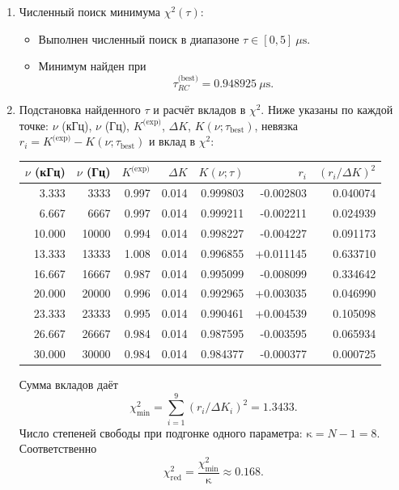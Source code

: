 \documentclass[a4paper,12pt]{article}
\begin{document}
\begin{enumerate}
\begin{enumerate}
  \item Численный поиск минимума $\chi^2(\tau)$:
  \begin{itemize}
    \item Выполнен численный поиск в диапазоне $\tau\in[0,5]\ \mu\text{s}$.
    \item Минимум найден при
    \[
    \tau_{RC}^{\text{(best)}} = 0.948925\ \mu\text{s}.
    \]
  \end{itemize}

  \item Подстановка найденного $\tau$ и расчёт вкладов в $\chi^2$. Ниже указаны по каждой точке: $\nu$ (кГц), $\nu$ (Гц), $K^{\text{(exp)}}$, $\Delta K$, $K(\nu;\tau_{\text{best}})$, невязка $r_i=K^{\text{(exp)}}-K(\nu;\tau_{\text{best}})$ и вклад в $\chi^2$:
  
  \begin{center}
  \begin{tabular}{|r|r|r|r|r|r|r|}
  \hline
  $\nu$ (кГц) & $\nu$ (Гц) & $K^{\text{(exp)}}$ & $\Delta K$ & $K(\nu;\tau)$ & $r_i$ & $(r_i/\Delta K)^2$ \\ \hline
   3.333 &  3333 & 0.997 & 0.014 & 0.999803 & -0.002803 & 0.040074 \\\hline
   6.667 &  6667 & 0.997 & 0.014 & 0.999211 & -0.002211 & 0.024939 \\\hline
  10.000 & 10000 & 0.994 & 0.014 & 0.998227 & -0.004227 & 0.091173 \\\hline
  13.333 & 13333 & 1.008 & 0.014 & 0.996855 & +0.011145 & 0.633710 \\\hline
  16.667 & 16667 & 0.987 & 0.014 & 0.995099 & -0.008099 & 0.334642 \\\hline
  20.000 & 20000 & 0.996 & 0.014 & 0.992965 & +0.003035 & 0.046990 \\\hline
  23.333 & 23333 & 0.995 & 0.014 & 0.990461 & +0.004539 & 0.105098 \\\hline
  26.667 & 26667 & 0.984 & 0.014 & 0.987595 & -0.003595 & 0.065934 \\\hline
  30.000 & 30000 & 0.984 & 0.014 & 0.984377 & -0.000377 & 0.000725 \\\hline
  \end{tabular}
  \end{center}

  Сумма вкладов даёт
  \[
  \chi^2_{\min} = \sum_{i=1}^{9} (r_i/\Delta K_i)^2 = 1.3433.
  \]
  Число степеней свободы при подгонке одного параметра: $\mathrm{\kappa}=N-1=8$. Соответственно
  \[
  \chi^2_{\text{red}}=\frac{\chi^2_{\min}}{\mathrm{\kappa}} \approx 0.168.
  \]


\end{enumerate}
\end{enumerate}
\end{document}
